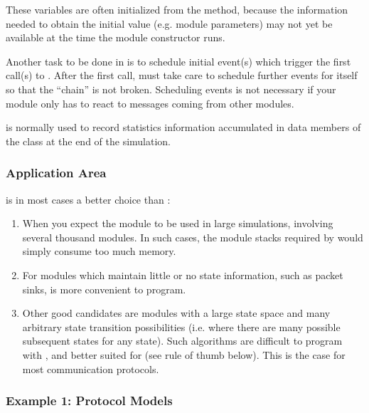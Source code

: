 These variables are often initialized from the 
method, because the information needed to obtain the initial value
(e.g. module parameters) may not yet be available at the time the
module constructor runs.

Another task to be done in  is to schedule
initial event(s) which trigger the first call(s)
to .  After the first call,
 must take care to schedule further events for
itself so that the ``chain'' is not broken. Scheduling events is not
necessary if your module only has to react to messages coming from
other modules.

 is normally used to record statistics information
accumulated in data members of the class at the end of the simulation.


\subsubsection{Application Area}
\label{sec:simple-modules:handlemessage:application-area}

 is in most cases a better choice than :

\begin{enumerate}
  \item When you expect the module to be used in large simulations,
      involving several thousand modules. In such cases, the module stacks
      required by  would simply consume too much memory.
  \item For modules which maintain little or no state information,
      such as packet sinks,  is more convenient to program.
  \item Other good candidates are modules with a large state space and
      many arbitrary state transition possibilities (i.e. where there
      are many possible subsequent states for any state). Such algorithms
      are difficult to program with , and
      better suited for  (see rule of thumb
      below). This is the case for most communication protocols.
\end{enumerate}


\subsubsection{Example 1: Protocol Models}
\label{sec:simple-modules:handlemessage:protocol-model-example}

